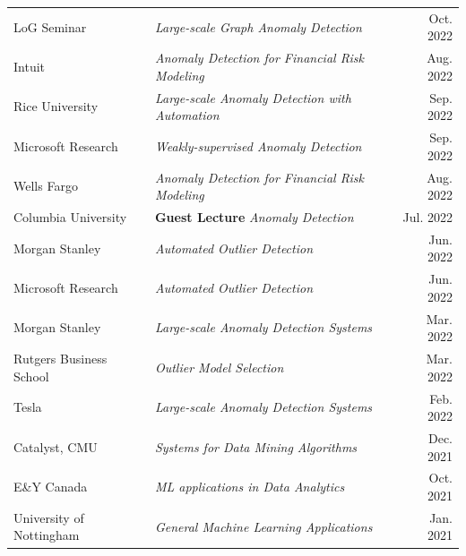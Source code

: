 \documentclass[margin,line,pifont,palatino,courier]{res}
\begin{document}
\begin{resume}
\begin{tabularx}{\textwidth}{@{}p{1.6in}Xr@{}}
LoG Seminar  & \textit{Large-scale Graph Anomaly Detection} & \hfill Oct. 2022 \\
Intuit  & \textit{Anomaly Detection for Financial Risk Modeling} & \hfill Aug. 2022 \\
Rice University  & \textit{Large-scale Anomaly Detection with Automation} & \hfill Sep. 2022 \\
Microsoft Research  & \textit{Weakly-supervised Anomaly Detection} & \hfill Sep. 2022 \\
Wells Fargo  & \textit{Anomaly Detection for Financial Risk Modeling} & \hfill Aug. 2022 \\
Columbia University  & \textbf{Guest Lecture} \textit{Anomaly Detection} & \hfill Jul. 2022 \\ 
Morgan Stanley  & \textit{Automated Outlier Detection} & \hfill Jun. 2022 \\
Microsoft Research  & \textit{Automated Outlier Detection} & \hfill Jun. 2022 \\
Morgan Stanley  & \textit{Large-scale Anomaly Detection Systems} & \hfill Mar. 2022 \\
Rutgers Business School  & \textit{Outlier Model Selection} & \hfill Mar. 2022 \\
Tesla  & \textit{Large-scale Anomaly Detection Systems} & \hfill Feb. 2022 \\
Catalyst, CMU  & \textit{Systems for Data Mining Algorithms} & \hfill Dec. 2021 \\
E\&Y Canada  & \textit{ML applications in Data Analytics} & \hfill Oct. 2021 \\
University of Nottingham  & \textit{General Machine Learning Applications} & \hfill Jan. 2021 \\
\end{tabularx}



\end{resume}
\end{document}
